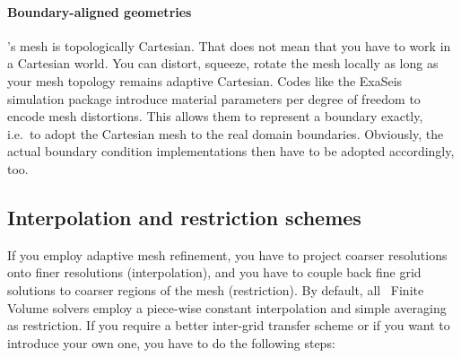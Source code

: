 \paragraph{Boundary-aligned geometries}

\ExaHyPE's mesh is topologically Cartesian.
That does not mean that you have to work in a Cartesian world.
You can distort, squeeze, rotate the mesh locally as long as your mesh topology
remains adaptive Cartesian.
Codes like the ExaSeis simulation package introduce material parameters per
degree of freedom to encode mesh distortions.
This allows them to represent a boundary exactly, i.e.~to adopt the Cartesian
mesh to the real domain boundaries.
Obviously, the actual boundary condition implementations then have to be adopted
accordingly, too.








\subsection{Interpolation and restriction schemes}
\label{section:exahype:finite-volumes:interpolation-schemes}

If you employ adaptive mesh refinement, you have to project coarser resolutions
onto finer resolutions (interpolation), and you have to couple back fine grid
solutions to coarser regions of the mesh (restriction).
By default, all \ExaHyPE\ Finite Volume solvers employ a piece-wise constant
interpolation and simple averaging as restriction.
If you require a better inter-grid transfer scheme or if you want to introduce your own one, you have to do the following steps:

